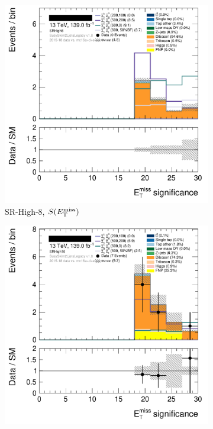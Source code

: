 \begin{figure}[tp]
\centering
\begin{subfigure}{0.495\textwidth}
\centering
\includegraphics[width=\textwidth]{figures/2ljets_def_met_Sign_SRHigh8.png}
\caption{SR-High-8, $S(E_\mathrm{T}^\mathrm{miss})$}
\end{subfigure}
\hfill
\begin{subfigure}{0.495\textwidth}
\centering
\includegraphics[width=\textwidth]{figures/2ljets_def_met_Sign_SRHigh16.png}

\end{subfigure}
\end{figure}
